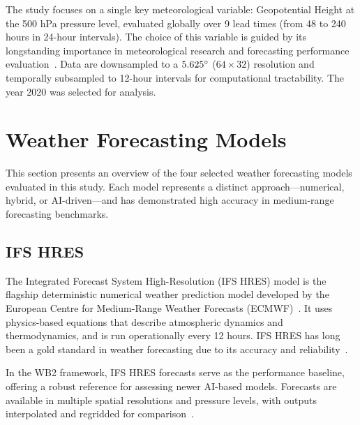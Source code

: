 \documentclass{article}
\begin{document}
The study focuses on a single key meteorological variable: Geopotential Height at the 500 hPa pressure level, evaluated globally over 9 lead times (from 48 to 240 hours in 24-hour intervals). The choice of this variable is guided by its longstanding importance in meteorological research and forecasting performance evaluation~\cite{rasp2020weatherbench,tian2007statistical,ams_level_of_nondivergence, alobaidy2022evaluation,bluestein1992synoptic}. Data are downsampled to a $5.625\degree$ ($64\times32$) resolution and temporally subsampled to 12-hour intervals for computational tractability. The year 2020 was selected for analysis.


\section{Weather Forecasting Models}
This section presents an overview of the four selected weather forecasting models evaluated in this study. Each model represents a distinct approach—numerical, hybrid, or AI-driven—and has demonstrated high accuracy in medium-range forecasting benchmarks.

\subsection{IFS HRES}
The Integrated Forecast System High-Resolution (IFS HRES) model is the flagship deterministic numerical weather prediction model developed by the European Centre for Medium-Range Weather Forecasts (ECMWF)~\cite{ecmwf2023ifs}. It uses physics-based equations that describe atmospheric dynamics and thermodynamics, and is run operationally every 12 hours. IFS HRES has long been a gold standard in weather forecasting due to its accuracy and reliability~\cite{rasp2024weatherbench2benchmarkgeneration}.

In the WB2 framework, IFS HRES forecasts serve as the performance baseline, offering a robust reference for assessing newer AI-based models. Forecasts are available in multiple spatial resolutions and pressure levels, with outputs interpolated and regridded for comparison~\cite{rasp2024weatherbench2benchmarkgeneration}.
\end{document}
